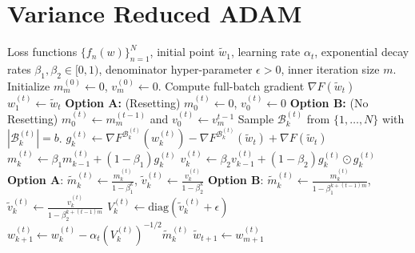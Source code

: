 \documentclass[twoside]{article}
\def\BB{\mathcal{B}}
\begin{document}
\section{Variance Reduced ADAM}
\label{sec:VRADAM}
\begin{algorithm}[h]
\caption{Variance Reduced ADAM}\label{alg:VRADAM}
\begin{algorithmic}
\Require Loss functions $\{f_n(w)\}_{n=1}^N$, initial point $\widetilde w_1$, learning rate $\alpha_t$, exponential decay rates $\beta_1, \beta_2\in[0,1)$, denominator hyper-parameter $\epsilon>0$, inner iteration size $m$. Initialize $m_m^{(0)}\gets 0$, $v_m^{(0)}\gets 0$. 
\State Compute full-batch gradient $\nabla F(\widetilde w_t)$
\State $w_1^{(t)}\gets \tilde  w_t$
\State \textbf{Option A:} (Resetting) $m_0^{(t)}\gets 0$, $v_0^{(t)}\gets 0$
\State \textbf{Option B:} (No Resetting) $m_0^{(t)}\gets m_{m}^{(t-1)}$ and $v_0^{(t)}\gets v_{m}^{t-1}$
\State Sample $\BB_k^{(t)}$ from $\{1,\ldots,N\}$ with $\left|\BB_k^{(t)}\right|=b$.
\State $g_k^{(t)}\gets \nabla F^{\BB_k^{(t)}}\left(w_k^{(t)}\right) - \nabla F^{\BB_k^{(t)}}(\widetilde w_t) + \nabla F(\widetilde w_t)$
\State $m_k^{(t)} \gets \beta_1 m_{k-1}^{(t)} + (1-\beta_1)g_k^{(t)}$
\State $v_k^{(t)} \gets \beta_2 v_{k-1}^{(t)} + (1-\beta_2)g_k^{(t)}\odot g_k^{(t)}$
\State  \textbf{Option A}: $\widetilde m^{(t)}_k \gets \frac{m^{(t)}_k}{1-\beta_1^k}$, $\widetilde v^{(t)}_k \gets \frac{v^{(t)}_k}{1-\beta_2^{k}}$
\State  \textbf{Option B}: $\widetilde m^{(t)}_k \gets \frac{m^{(t)}_k} {1-\beta_1^{k+(t-1)m}}$, $\widetilde v^{(t)}_k \gets \frac{v^{(t)}_k}{1-\beta_2^{k+(t-1)m}}$
\State $V_k^{(t)}\gets \mathrm{diag}\left(\widetilde v_k^{(t)} + \epsilon\right)$
\State $w^{(t)}_{k+1} \gets w^{(t)}_k - \alpha_t \left(V_k^{(t)}\right)^{-1/2}\widetilde m_k^{(t)}$
\EndFor
\State $\widetilde w_{t+1}\gets w_{m+1}^{(t)}$
\EndFor
\end{algorithmic}
\end{algorithm}
\end{document}
